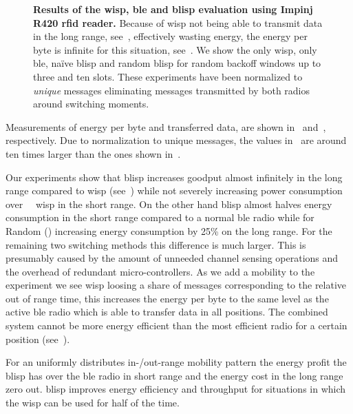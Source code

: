 \documentclass[conference,letterpaper,twoside,final,10pt]{IEEEtran}
\begin{document}
\begin{figure}
	\centering
\caption{\textbf{Results of the \acs{wisp}, \acs{ble} and \acs{blisp} evaluation using Impinj R420 \acs{rfid} reader.}
	Because of \acs{wisp} not being able to transmit data in the long range, see~, effectively wasting energy, the energy per byte is infinite for this situation, see~.
	We show the only \acs{wisp}, only \acs{ble}, na\"ive \acs{blisp} and random \acs{blisp} for random backoff windows up to three and ten slots.
	These experiments have been normalized to \emph{unique} messages eliminating messages transmitted by both radios around switching moments.
	}
	\label{fig:blisp_results}
\end{figure}

Measurements of energy per byte and transferred data, are shown in~ and~, respectively. Due to normalization to unique messages, the values in~ are around ten times larger than the ones shown in~.

Our experiments show that \ac{blisp} increases goodput almost infinitely in the long range compared to \ac{wisp} (see~) while not severely increasing power consumption over {~~}\ac{wisp} in the short range.
On the other hand \ac{blisp} almost halves energy consumption in the short range compared to a normal \ac{ble} radio while for Random () increasing energy consumption by 25\% on the long range. For the remaining two switching methods this difference is much larger. This is presumably caused by the amount of unneeded channel sensing operations and the overhead of redundant micro-controllers.
As we add a mobility to the experiment we see \ac{wisp} loosing a share of messages corresponding to the relative out of range time, this increases the energy per byte to the same level as the active \ac{ble} radio which is able to transfer data in all positions.
The combined system cannot be more energy efficient than the most efficient radio for a certain position (see~).

For an uniformly distributes in-/out-range mobility pattern the energy profit the \ac{blisp} has over the \ac{ble} radio in short range and the energy cost in the long range zero out.
\ac{blisp} improves energy efficiency and throughput for situations in which the \ac{wisp} can be used for half of the time.
\end{document}
